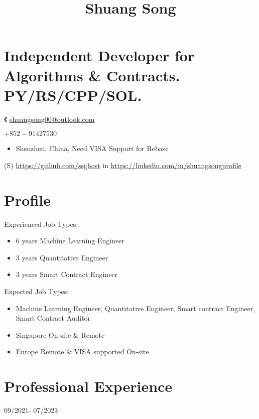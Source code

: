 \documentclass[10pt]{article}
\title{Shuang Song }
\author{}
\date{}
\begin{document}
\maketitle
\section*{Independent Developer for Algorithms \& Contracts. PY/RS/CPP/SOL.}
《 \href{mailto:shuangsong00@outlook.com}{shuangsong00@outlook.com}

$+852-91427530$

\begin{itemize}
  \item Shenzhen, China, Need VISA Support for Rebase
\end{itemize}

(S) \href{https://github.com/ssghost}{https://github.com/ssghost} in \href{https://linkedin.com/in/shuangsongprofile}{https://linkedin.com/in/shuangsongprofile}

\section*{Profile}
Experienced Job Types:

\begin{itemize}
  \item 6 years Machine Learning Engineer

  \item 3 years Quantitative Engineer

  \item 3 years Smart Contract Engineer

\end{itemize}

Expected Job Types:

\begin{itemize}
  \item Machine Learning Engineer, Quantitative Engineer, Smart contract Engineer, Smart Contract Auditor

  \item Singapore On-site \& Remote

  \item Europe Remote \& VISA supported On-site

\end{itemize}

\section*{Professional Experience}
09/2021- 07/2023
\end{document}
